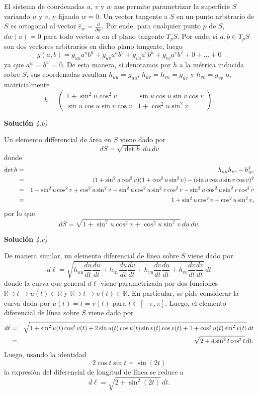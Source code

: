 \documentclass[11pt,spanish]{article}
\newcommand{\RR}{\mathbb{R}}
\begin{document}
El sistema de coordenadas $u$, $v$ y $w$ nos permite parametrizar la superficie $S$ variando $u$ y $v$, y fijando $w=0$.
Un vector tangente a $S$ en un punto arbitrario de $S$ es ortogonal al vector $\hat{e}_w=\frac{\partial}{\partial w}$.
Por ende, para cualquier punto $p$ de $S$, $dw(a)=0$ para todo vector $a$ en el plano tangente $T_pS$.
Por ende, si $a,b\in T_pS$ son dos vectores arbitrarios en dicho plano tangente, luego
$$
g(a,b)
=
g_{uu}a^ub^u
+
g_{uv}a^ub^v
+
g_{vu}a^vb^u
+
g_{vv}a^vb^v
+
0
+
...
+
0
$$
ya que $a^w=b^w=0$.
De esta manera, si denotamos por $h$ a la m\'etrica inducida sobre $S$, sus coordenadas resultan
$h_{uu} = g_{uu}$, 
$h_{uv} = h_{vu} = g_{uv}$ y
$h_{vv} = g_{vv}$ o, matricialmente
$$
\boxed{
h =
\begin{pmatrix}
1 + \sin^2 u \cos^2 v & \sin u \cos u \sin v \cos v\\
\sin u \cos u \sin v \cos v & 1 + \cos^2 u \sin^2 v
\end{pmatrix}
.
}
$$

\vspace{0.5cm}
{\bf Soluci\'on }{\em 4.b)}
\vspace{0.5cm}

Un elemento differencial de área en $S$ viene dado por
$$
dS
=
\sqrt{\det h}\, du\,dv
$$
donde
\begin{eqnarray}
\det h
&=&
h_{uu}
h_{vv}
-
h_{uv}^2
\notag
\\
&=&
(1+\sin^2 u\cos^2 v)
(1+\cos^2 u\sin^2 v)
-
(\sin u \cos u \sin v \cos v)^2
\notag
\\
&=&
1
+
\sin^2 u\cos^2 v
+
\cos^2 u\sin^2 v
+
\sin^2 u \cos^2 u \sin^2 v \cos^2 v
-
\sin^2 u \cos^2 u \sin^2 v \cos^2 v
\notag
\\
&=&
1
+
\sin^2 u\cos^2 v
+
\cos^2 u\sin^2 v
\notag
,
\end{eqnarray}
por lo que
$$
dS
=
\sqrt{
1
+
\sin^2 u\cos^2 v
+
\cos^2 u\sin^2 v
}\,
du\,dv
.
$$

\vspace{0.5cm}
{\bf Soluci\'on }{\em 4.c)}
\vspace{0.5cm}

De manera similar, un elemento diferencial de l\'inea sobre $S$ viene dado por
$$
d\ell
=
\sqrt{
h_{uu}\frac{du}{dt}\frac{du}{dt}
+
h_{uv}\frac{du}{dt}\frac{dv}{dt}
+
h_{vu}\frac{dv}{dt}\frac{du}{dt}
+
h_{vv}\frac{dv}{dt}\frac{dv}{dt}
}\,
dt
$$
donde la curva que general $d\ell$ viene parametrizada por dos funciones $\RR\ni t\to u(t)\in \RR$ y $\RR\ni t\to v(t)\in \RR$.
En particular, se pide considerar la curva dada por $u(t)=t=v(t)$ para $t\in [-\pi,\pi]$.
Luego, el elemento diferencial de l\'inea sobre $S$ viene dado por
\begin{eqnarray}
d\ell
&=&
\sqrt{
1+\sin^2 u(t)\cos^2 v(t)
+
2\sin u(t)\cos u(t)\sin v(t)\cos v(t)
+
1+\cos^2 u(t)\sin^2 v(t)
}\,
dt
\notag
\\
&=&
\sqrt{
2
+
4\sin^2 t\cos^2 t
}\,
dt
\notag
.
\end{eqnarray}
Luego, usando la identidad
$$
2\cos t\sin t
=
\sin(2t)
$$
la expresi\'on del diferencial de longitud de l\'inea se reduce a
$$
d\ell
=
\sqrt{
2
+
\sin^2 (2t)
}\,
dt
.
$$
\end{document}
